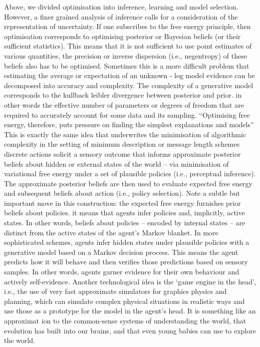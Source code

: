 Above, we divided optimisation into inference, learning and model selection. However, a finer grained analysis of inference calls for a consideration of the representation of uncertainty. If one subscribes to the free energy principle, then optimisation corresponds to optimising posterior or Bayesian beliefs (or their sufficient statistics). This means that it is not sufficient to use point estimates of various quantities, the precision or inverse dispersion (i.e., negentropy) of these beliefs also has to be optimised. Sometimes this is a more difficult problem that estimating the average or expectation of an unknown 
- log model evidence can be decomposed into accuracy and complexity. The complexity of a generative model corresponds to the kullback leibler divergence between posterior and prior. in other words the effective number of parameters or degrees of freedom that are required to accurately account for some data and its sampling. “Optimising free energy, therefore, puts pressure on finding the simplest explanations and models” 
This is exactly the same idea that underwrites the minimisation of algorithmic complexity in the setting of minimum description or message length schemes
discrete actions solicit a sensory outcome that informs approximate posterior beliefs about hidden or external states of the world – via minimisation of variational free energy under a set of plausible policies (i.e., perceptual inference). The approximate posterior beliefs are then used to evaluate expected free energy and subsequent beliefs about action (i.e., policy selection). Note a subtle but important move in this construction: the expected free energy furnishes prior beliefs about policies.
it means that agents infer policies and, implicitly, active states. In other words, beliefs about policies – encoded by internal states – are distinct from the active states of the agent’s Markov blanket. In more sophisticated schemes, agents infer hidden states under plausible policies with a generative model based on a Markov decision process. This means the agent predicts how it will behave and then verifies those predictions based on sensory samples. In other words, agents garner evidence for their own behaviour and actively self-evidence.
Another technological idea is the ‘game engine in the head’, i.e., the use of very fast approximate simulators for graphics physics and planning, which can simulate complex physical situations in realistic ways and use those as a prototype for the model in the agent’s head. It is something like an approximat ion to the common-sense systems of understanding the world, that evolution has built into our brains, and that even young babies can use to explore the world.


